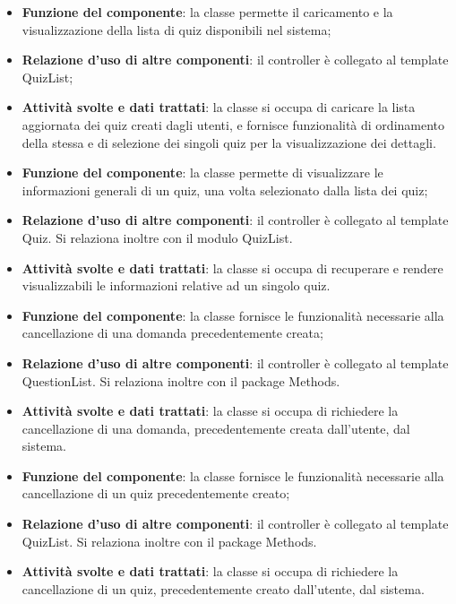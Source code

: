 
\begin{itemize}
	\item\textbf{Funzione del componente}:  la classe permette il caricamento e la visualizzazione della lista di quiz disponibili nel sistema;
	\item\textbf{Relazione d'uso di altre componenti}: il controller è collegato al template QuizList;
	\item\textbf{Attività svolte e dati trattati}: la classe si occupa di caricare la lista aggiornata dei quiz creati dagli utenti, e fornisce funzionalità di ordinamento della stessa e di selezione dei singoli quiz per la visualizzazione dei dettagli. 
\end{itemize}


\begin{itemize}
	\item\textbf{Funzione del componente}: la classe permette di visualizzare le informazioni generali di un quiz, una volta selezionato dalla lista dei quiz;
	\item\textbf{Relazione d'uso di altre componenti}: il controller è collegato al template Quiz. Si relaziona inoltre con il modulo QuizList.
	\item\textbf{Attività svolte e dati trattati}: la classe si occupa di recuperare e rendere visualizzabili le informazioni relative ad un singolo quiz.
\end{itemize}


\begin{itemize}
	\item\textbf{Funzione del componente}: la classe fornisce le funzionalità necessarie alla cancellazione di una domanda precedentemente creata;
	\item\textbf{Relazione d'uso di altre componenti}: il controller è collegato al template QuestionList. Si relaziona inoltre con il package Methods.
	\item\textbf{Attività svolte e dati trattati}: la classe si occupa di richiedere la cancellazione di una domanda, precedentemente creata dall'utente, dal sistema.
\end{itemize}


\begin{itemize}
	\item\textbf{Funzione del componente}: la classe fornisce le funzionalità necessarie alla cancellazione di un quiz precedentemente creato;
	\item\textbf{Relazione d'uso di altre componenti}: il controller è collegato al template QuizList. Si relaziona inoltre con il package Methods.
	\item\textbf{Attività svolte e dati trattati}:  la classe si occupa di richiedere la cancellazione di un quiz, precedentemente creato dall'utente, dal sistema.
\end{itemize}

